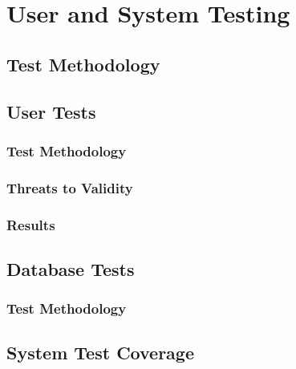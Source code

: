\chapter{User and System Testing}

\section{Test Methodology}

\section{User Tests}

\subsection{Test Methodology}

\subsection{Threats to Validity}

\subsection{Results}

\section{Database Tests}

\subsection{Test Methodology}

\section{System Test Coverage}

